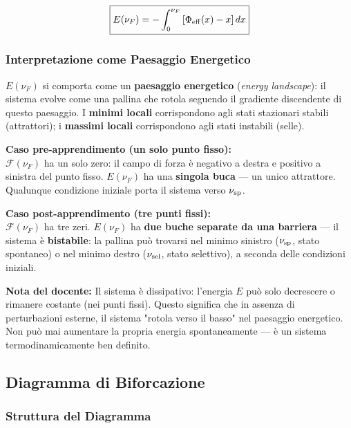\begin{equation}
\boxed{E(\nu_F) = -\int_0^{\nu_F} \left[\Phi_{\rm eff}(x) - x\right] dx}
\end{equation}

\subsubsection{Interpretazione come Paesaggio Energetico}

$E(\nu_F)$ si comporta come un \textbf{paesaggio energetico} (\textit{energy landscape}): il sistema evolve come una pallina che rotola seguendo il gradiente discendente di questo paesaggio. I \textbf{minimi locali} corrispondono agli stati stazionari stabili (attrattori); i \textbf{massimi locali} corrispondono agli stati instabili (selle).

\textbf{Caso pre-apprendimento (un solo punto fisso):}\\
$\mathcal{F}(\nu_F)$ ha un solo zero: il campo di forza è negativo a destra e positivo a sinistra del punto fisso. $E(\nu_F)$ ha una \textbf{singola buca} — un unico attrattore. Qualunque condizione iniziale porta il sistema verso $\nu_{\rm sp}$.

\textbf{Caso post-apprendimento (tre punti fissi):}\\
$\mathcal{F}(\nu_F)$ ha tre zeri. $E(\nu_F)$ ha \textbf{due buche separate da una barriera} — il sistema è \textbf{bistabile}: la pallina può trovarsi nel minimo sinistro ($\nu_{\rm sp}$, stato spontaneo) o nel minimo destro ($\nu_{\rm sel}$, stato selettivo), a seconda delle condizioni iniziali.

\begin{tcolorbox}[colback=gray!5, colframe=gray!40, arc=2mm, boxrule=0.5pt]
\textbf{Nota del docente:} Il sistema è dissipativo: l'energia $E$ può solo decrescere o rimanere costante (nei punti fissi). Questo significa che in assenza di perturbazioni esterne, il sistema "rotola verso il basso" nel paesaggio energetico. Non può mai aumentare la propria energia spontaneamente — è un sistema termodinamicamente ben definito.
\end{tcolorbox}


\subsection{Diagramma di Biforcazione}

\subsubsection{Struttura del Diagramma}

